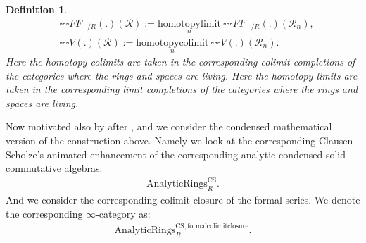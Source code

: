 \documentclass[12pt]{book}
\newtheorem{definition}{Definition}
\begin{document}
\begin{definition}
\begin{align}
&{\square\square\square}{{FF}}_{-/R}(.)(\mathcal{R}):=\underset{n}{\mathrm{homotopylimit}}~{\square\square\square}{{FF}}_{-/R}(.)(\mathcal{R}_n),\\	
&{\square\square\square}V(.)(\mathcal{R}):=\underset{n}{\mathrm{homotopycolimit}}~{\square\square\square}V(.)(\mathcal{R}_n).
\end{align}
Here the homotopy colimits are taken in the corresponding colimit completions of the categories where the rings and spaces are living. Here the homotopy limits are taken in the corresponding limit completions of the categories where the rings and spaces are living.
\end{definition}

\indent Now motivated also by \cite{M} after \cite{CS1}, \cite{CS2} and \cite{CS3} we consider the condensed mathematical version of the construction above. Namely we look at the corresponding Clausen-Scholze's animated enhancement of the corresponding analytic condensed solid commutative algebras:
\begin{align}
\mathrm{AnalyticRings}^\mathrm{CS}_R.	
\end{align}
And we consider the corresponding colimit closure of the formal series. We denote the corresponding $\infty$-category as:
\begin{align}
\mathrm{AnalyticRings}^\mathrm{CS,formalcolimitclosure}_R.	
\end{align}
\end{document}
